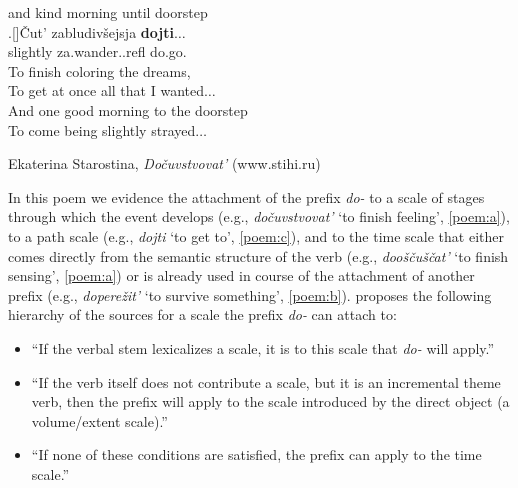and kind morning until doorstep\\
\bg.[]\v{C}ut' zabludiv\v{s}ejsja \textbf{dojti}$\ldots$\\
slightly za.wander..refl do.go.\\
\vspace{0.5em}
To finish coloring the dreams,\\
To get at once all that I wanted$\ldots$\\
And one good morning to the doorstep\\
To come being slightly strayed$\ldots$
\begin{flushright}
Ekaterina Starostina, \textit{Do\v{c}uvstvovat'} (www.stihi.ru)
\end{flushright}

In this poem we evidence the attachment of the prefix \textit{do-} to a scale of stages through which the event develops (e.g., \textit{do\v{c}uvstvovat'} `to finish feeling', \ref{poem:a}), to a path scale (e.g., \textit{dojti} `to get to', \ref{poem:c}), and to the time scale that either comes directly from the semantic structure of the verb (e.g., \textit{doo\v{s}\v{c}u\v{s}\v{c}at'} `to finish sensing', \ref{poem:a}) or is already used in course of the attachment of another prefix (e.g., \textit{dopere\v{z}it'} `to survive something', \ref{poem:b}). \citet{Kagan:book} proposes the following hierarchy of the sources for a scale the prefix \textit{do-} can attach to: 
\begin{itemize}
\item ``If the verbal stem lexicalizes a scale, it is to this scale that \textit{do-} will apply.''
\item ``If the verb itself does not contribute a scale, but it is an incremental
theme verb, then the prefix will apply to the scale introduced by the direct object (a volume/extent scale).''
\item ``If none of these conditions are satisfied, the prefix can apply to the time scale.''
\end{itemize}

